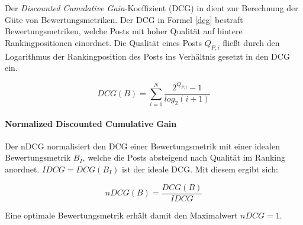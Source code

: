 Der \textit{Discounted Cumulative Gain}-Koeffizient (DCG) in \cite{Biega2018405} dient zur Berechnung der Güte von Bewertungsmetriken. Der DCG in Formel \ref{dcg} bestraft Bewertungsmetriken, welche Posts mit hoher Qualität auf hintere Rankingpositionen einordnet. Die Qualität eines Posts $Q_{P,i}$ fließt durch den Logarithmus der Rankingposition des Posts ins Verhältnis gesetzt in den DCG ein.

\begin{equation}
\label{dcg}
DCG(B) = \sum_{i = 1}^{N}\frac{2^{Q_{P,i}}-1}{log_2(i + 1)}
\end{equation} 

\paragraph{Normalized Discounted Cumulative Gain}

Der nDCG normalisiert den DCG einer Bewertungsmetrik mit einer idealen Bewertungsmetrik $B_I$, welche die Posts absteigend nach Qualität im Ranking anordnet. $IDCG = DCG(B_I)$ ist der ideale DCG. Mit diesem ergibt sich:

\begin{equation}
\label{ndcg}
nDCG(B) = \frac{DCG(B)}{IDCG} 
\end{equation}

Eine optimale Bewertungsmetrik erhält damit den Maximalwert $nDCG = 1$.







